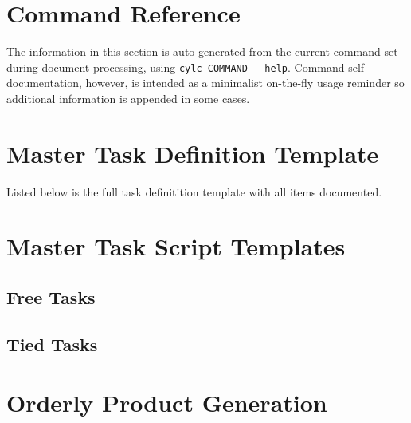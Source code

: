 \documentclass[11pt,a4paper]{article}
\begin{document}
\pagebreak
\section{Command Reference}
\label{CommandReference}

The information in this section is auto-generated from
the current command set during document processing, using  
\lstinline=cylc COMMAND --help=. 
Command self-documentation, however, is intended as a minimalist
on-the-fly usage reminder so additional information is appended in
some cases.
  
\lstset{language=usage}



\pagebreak
\section{Master Task Definition Template}
\label{MasterTaskDefinitionTemplate}

Listed below is the full task definitition template with all items
documented.

\lstset{language=cylctaskdef}



\lstset{language=}

\pagebreak
\section{Master Task Script Templates}
\label{MasterTaskScriptTemplates}



\lstset{language=bash}

\pagebreak
\subsection{Free Tasks}


\pagebreak
\subsection{Tied Tasks}


\pagebreak
\section{Orderly Product Generation}
\label{OrderlyProductGeneration}
\end{document}
